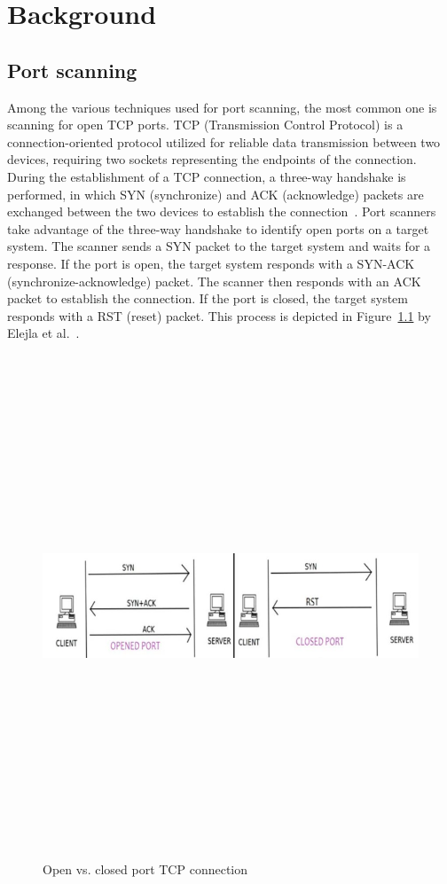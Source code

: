 \chapter{Background}

\section{Port scanning}

Among the various techniques used for port scanning, the most common one is scanning for open TCP ports. TCP (Transmission Control Protocol) is a connection-oriented protocol utilized for reliable data transmission between two devices, requiring two sockets representing the endpoints of the connection. During the establishment of a TCP connection, a three-way handshake is performed, in which SYN (synchronize) and ACK (acknowledge) packets are exchanged between the two devices to establish the connection~.
Port scanners take advantage of the three-way handshake to identify open ports on a target system. The scanner sends a SYN packet to the target system and waits for a response. If the port is open, the target system responds with a SYN-ACK (synchronize-acknowledge) packet. The scanner then responds with an ACK packet to establish the connection. If the port is closed, the target system responds with a RST (reset) packet. This process is depicted in Figure~\ref{fig:open-vs-closed} by Elejla et al.~.

\begin{figure}[h]
    \centering
    \includegraphics[width=15cm, height=15cm, keepaspectratio]{background/img/open_vs_closed_port.png}
    \caption{Open vs. closed port TCP connection}
    \label{fig:open-vs-closed}
\end{figure}

